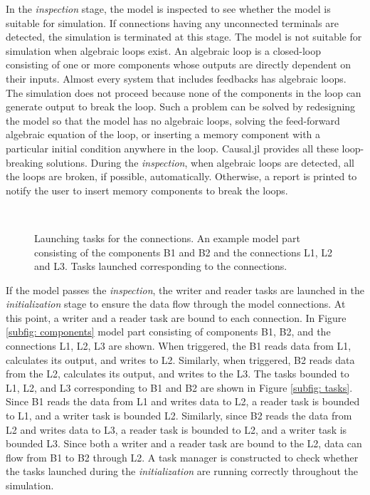 \documentclass{juliacon}
\begin{document}
In the \textit{inspection} stage, the model is inspected to see whether the model is suitable for simulation. If connections having any unconnected terminals are detected, the simulation is terminated at this stage. The model is not suitable for simulation when algebraic loops exist\cite{lamego2001adaptive}. An algebraic loop is a closed-loop consisting of one or more components whose outputs are directly dependent on their inputs. Almost every system that includes feedbacks has algebraic loops. The simulation does not proceed because none of the components in the loop can generate output to break the loop. Such a problem can be solved by redesigning the model so that the model has no algebraic loops, solving the feed-forward algebraic equation of the loop, or inserting a memory component with a particular initial condition anywhere in the loop. Causal.jl provides all these loop-breaking solutions. During the \textit{inspection}, when algebraic loops are detected, all the loops are broken, if possible, automatically. Otherwise, a report is printed to notify the user to insert memory components to break the loops.

\begin{figure}
    \centering
     \\
    \caption{Launching tasks for the connections. \protect{} An example model part consisting of the components B1 and B2 and the connections L1, L2 and L3. \protect{} Tasks launched corresponding to the connections.}
    \label{fig: tasks for components}
\end{figure}

If the model passes the \textit{inspection}, the writer and reader tasks are launched in the \textit{initialization} stage to ensure the data flow through the model connections. At this point, a writer and a reader task are bound to each connection. In Figure \ref{subfig: components} model part consisting of components B1, B2, and the connections L1, L2, L3 are shown. When triggered, the B1 reads data from L1, calculates its output, and writes to L2. Similarly, when triggered, B2 reads data from the L2, calculates its output, and writes to the L3. The tasks bounded to L1, L2, and L3 corresponding to B1 and B2 are shown in Figure \ref{subfig: tasks}. Since B1 reads the data from L1 and writes data to L2, a reader task is bounded to L1, and a writer task is bounded L2. Similarly, since B2 reads the data from L2 and writes data to L3, a reader task is bounded to L2, and a writer task is bounded L3. Since both a writer and a reader task are bound to the L2, data can flow from B1 to B2 through L2. A task manager is constructed to check whether the tasks launched during the \textit{initialization} are running correctly throughout the simulation.
\end{document}
